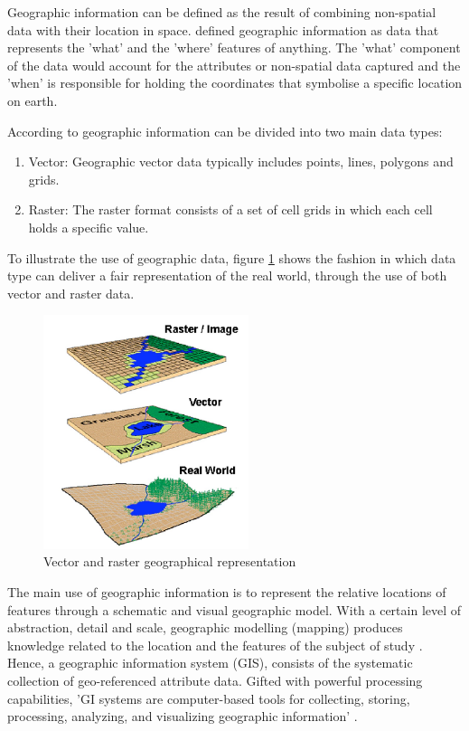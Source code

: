 \documentclass[12pt, a4paper]{report}
\begin{document}
Geographic information can be defined as the result of combining non-spatial data with their location in space. \cite{longleyGeographicInformationScience2015} defined geographic information as data that represents the 'what' and the 'where' features of anything. The 'what' component of the data would account for the attributes or non-spatial data captured and the 'when' is responsible for holding the coordinates that symbolise a specific location on earth.

According to \cite{maclachlanAppliedGeographicInformation2022} geographic information can be divided into two main data types:

\begin{enumerate}
  \item Vector: Geographic vector data typically includes points, lines, polygons and grids.
  \item Raster: The raster format consists of a set of cell grids in which each cell holds a specific value. 
\end{enumerate}

To illustrate the use of geographic data, figure \ref{fig:Fig_data_types} shows the fashion in which data type can deliver a fair representation of the real world, through the use of both vector and raster data.

\begin{figure}[htp]
    \centering
    \includegraphics[width=6cm]{Images/Fig_Types_Geodata.png}
    \caption{Vector and raster geographical representation \citep{saabConceptualizingSpaceMapping2003}}
    \label{fig:Fig_data_types}
\end{figure}



The main use of geographic information is to represent the relative locations of features through a schematic and visual geographic model. With a certain level of abstraction, detail and scale, geographic modelling (mapping) produces knowledge related to the location and the features of the subject of study \citep{longleyGeographicInformationScience2015}. Hence, a geographic information system (GIS), consists of the systematic collection of geo-referenced attribute data. Gifted with powerful processing capabilities, 'GI systems are computer-based tools for collecting, storing, processing, analyzing, and visualizing geographic information' \citep{longleyGeographicInformationScience2015}.
\end{document}
